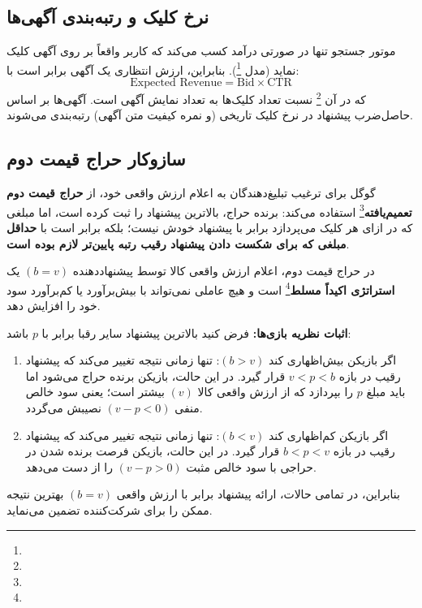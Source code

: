 \subsection{نرخ کلیک \texorpdfstring{}{(CTR)} و رتبه‌بندی آگهی‌ها}
موتور جستجو تنها در صورتی درآمد کسب می‌کند که کاربر واقعاً بر روی آگهی کلیک نماید (مدل \footnote{}). بنابراین، ارزش انتظاری یک آگهی برابر است با:
\begin{equation}
\text{Expected Revenue} = \text{Bid} \times \text{CTR}
\end{equation}
که در آن \footnote{} نسبت تعداد کلیک‌ها به تعداد نمایش آگهی است. آگهی‌ها بر اساس حاصل‌ضرب پیشنهاد در نرخ کلیک تاریخی (و نمره کیفیت متن آگهی) رتبه‌بندی می‌شوند.

\subsection{سازوکار حراج قیمت دوم \texorpdfstring{}{(Vickrey-Clarke-Groves Auction)}}
گوگل برای ترغیب تبلیغ‌دهندگان به اعلام ارزش واقعی خود، از \textbf{حراج قیمت دوم تعمیم‌یافته}\footnote{} استفاده می‌کند:
برنده حراج، بالاترین پیشنهاد را ثبت کرده است، اما مبلغی که در ازای هر کلیک می‌پردازد برابر با پیشنهاد خودش نیست؛ بلکه برابر است با \textbf{حداقل مبلغی که برای شکست دادن پیشنهاد رقیب رتبه پایین‌تر لازم بوده است}.

\begin{theorem}
در حراج قیمت دوم، اعلام ارزش واقعی کالا توسط پیشنهاددهنده $(b = v)$ یک \textbf{استراتژی اکیداً مسلط}\footnote{} است و هیچ عاملی نمی‌تواند با بیش‌برآورد یا کم‌برآورد سود خود را افزایش دهد.
\end{theorem}
\textbf{اثبات نظریه بازی‌ها:}
فرض کنید بالاترین پیشنهاد سایر رقبا برابر با $p$ باشد:
\begin{enumerate}
    \item اگر بازیکن بیش‌اظهاری کند $(b > v)$:
    تنها زمانی نتیجه تغییر می‌کند که پیشنهاد رقیب در بازه $v < p < b$ قرار گیرد. در این حالت، بازیکن برنده حراج می‌شود اما باید مبلغ $p$ را بپردازد که از ارزش واقعی کالا $(v)$ بیشتر است؛ یعنی سود خالص منفی $(v - p < 0)$ نصیبش می‌گردد.
    \item اگر بازیکن کم‌اظهاری کند $(b < v)$:
    تنها زمانی نتیجه تغییر می‌کند که پیشنهاد رقیب در بازه $b < p < v$ قرار گیرد. در این حالت، بازیکن فرصت برنده شدن در حراجی با سود خالص مثبت $(v - p > 0)$ را از دست می‌دهد.
\end{enumerate}
بنابراین، در تمامی حالات، ارائه پیشنهاد برابر با ارزش واقعی $(b = v)$ بهترین نتیجه ممکن را برای شرکت‌کننده تضمین می‌نماید.

